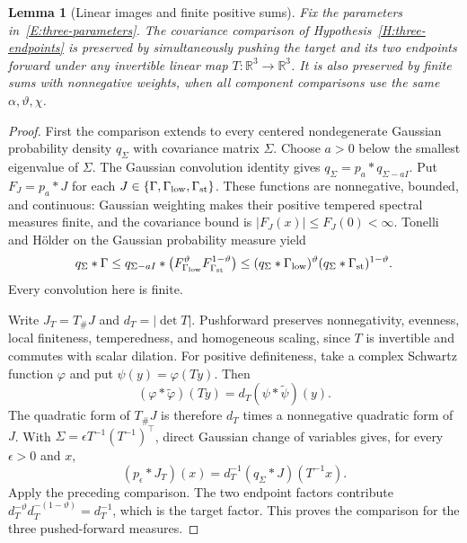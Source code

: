 \documentclass[12pt]{article}
\numberwithin{equation}{section}
\newtheorem{lemma}[theorem]{Lemma}
\theoremstyle{definition}
\newcommand{\R}{\mathbb{R}}
\begin{document}
\begin{lemma}[Linear images and finite positive sums]\label{L:endpoint-closure}
  Fix the parameters in~\eqref{E:three-parameters}.
  The covariance comparison of Hypothesis~\ref{H:three-endpoints}
  is preserved by simultaneously pushing the target and its two
  endpoints forward under any invertible linear map $T:\R^3\to\R^3$.
  It is also preserved by finite sums with nonnegative weights, when
  all component comparisons use the same $\alpha,\vartheta,\chi$.
\end{lemma}

\begin{proof}
  First the comparison extends to every centered nondegenerate
  Gaussian probability density $q_\Sigma$ with covariance matrix
  $\Sigma$. Choose $a>0$ below the smallest eigenvalue of $\Sigma$.
  The Gaussian convolution identity gives
  $q_\Sigma=p_a*q_{\Sigma-aI}$. Put $F_J=p_a*J$ for each
  $J\in\{\Gamma,\Gamma_{\rm low},\Gamma_{\rm st}\}$.
  These functions are nonnegative, bounded, and continuous:
  Gaussian weighting makes their positive tempered spectral
  measures finite, and the covariance bound is
  $|F_J(x)|\le F_J(0)<\infty$.
  Tonelli and H\"older on the Gaussian probability measure yield
  \[
    q_\Sigma*\Gamma
    \le q_{\Sigma-aI}*
    \left(F_{\Gamma_{\rm low}}^\vartheta
    F_{\Gamma_{\rm st}}^{1-\vartheta}\right)
    \le(q_\Sigma*\Gamma_{\rm low})^\vartheta
    (q_\Sigma*\Gamma_{\rm st})^{1-\vartheta}.
  \]
  Every convolution here is finite.

  Write $J_T=T_\#J$ and $d_T=|\det T|$. Pushforward preserves
  nonnegativity, evenness, local finiteness, temperedness, and
  homogeneous scaling, since $T$ is invertible and commutes with
  scalar dilation. For positive definiteness, take a complex
  Schwartz function $\varphi$ and put $\psi(y)=\varphi(Ty)$.
  Then
  \[
    (\varphi*\widetilde\varphi)(Ty)
    =d_T(\psi*\widetilde\psi)(y).
  \]
  The quadratic form of $T_\#J$ is therefore $d_T$ times a
  nonnegative quadratic form of $J$.
  With $\Sigma=\epsilon T^{-1}(T^{-1})^\top$, direct Gaussian
  change of variables gives, for every $\epsilon>0$ and $x$,
  \[
    (p_\epsilon*J_T)(x)
    =d_T^{-1}(q_\Sigma*J)(T^{-1}x).
  \]
  Apply the preceding comparison. The two endpoint factors
  contribute $d_T^{-\vartheta}d_T^{-(1-\vartheta)}=d_T^{-1}$,
  which is the target factor. This proves the comparison for
  the three pushed-forward measures.


\end{proof}
\end{document}
